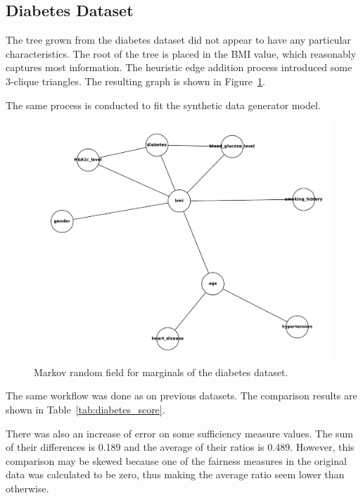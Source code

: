 \documentclass[acmsmall,sigconf]{acmart}
\begin{document}
\subsection{Diabetes Dataset}

The tree grown from the diabetes dataset did not appear to have any particular characteristics. The root of the tree is placed in the BMI value, which reasonably captures most information. The heuristic edge addition process introduced some 3-clique triangles. The resulting graph is shown in Figure~\ref{fig:diabetes_mst}.

The same process is conducted to fit the synthetic data generator model.

\begin{figure}[h]
\centering
\includegraphics[width=\linewidth]{diabetes_mst}
\caption{Markov random field for marginals of the diabetes dataset.}
\label{fig:diabetes_mst}
\end{figure}

The same workflow was done as on previous datasets. The comparison results are shown in Table~\ref{tab:diabetes_score}.

There was also an increase of error on some sufficiency measure values. The sum of their differences is 0.189 and the average of their ratios is 0.489. However, this comparison may be skewed because one of the fairness measures in the original data was calculated to be zero, thus making the average ratio seem lower than otherwise.
\end{document}
